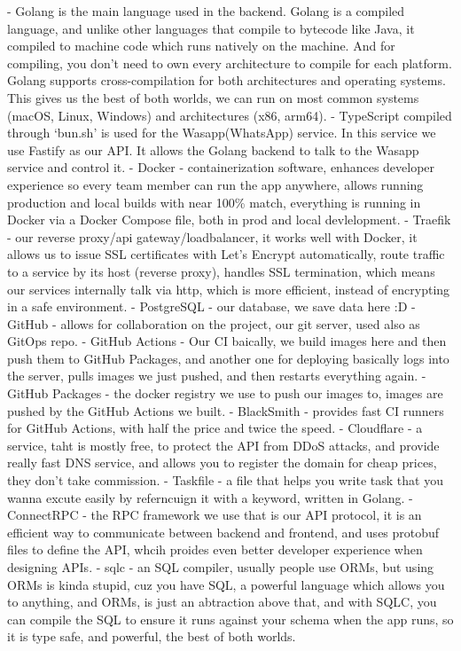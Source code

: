 - Golang is the main language used in the backend. Golang is a compiled language, and unlike other languages that compile to bytecode like Java, it compiled to machine code which runs natively on the machine. And for compiling, you don't need to own every architecture to compile for each platform. Golang supports cross-compilation for both architectures and operating systems. This gives us the best of both worlds, we can run on most common systems (macOS, Linux, Windows) and architectures (x86, arm64).
- TypeScript compiled through `bun.sh' is used for the Wasapp(WhatsApp) service. In this service we use Fastify as our API. It allows the Golang backend to talk to the Wasapp service and control it.
- Docker - containerization software, enhances developer experience so every team member can run the app anywhere, allows running production and local builds with near 100\% match, everything is running in Docker via a Docker Compose file, both in prod and local devlelopment.
- Traefik - our reverse proxy/api gateway/loadbalancer, it works well with Docker, it allows us to issue SSL certificates with Let's Encrypt automatically, route traffic to a service by its host (reverse proxy), handles SSL termination, which means our services internally talk via http, which is more efficient, instead of encrypting in a safe environment.
- PostgreSQL - our database, we save data here :D
- GitHub - allows for collaboration on the project, our git server, used also as GitOps repo.
    - GitHub Actions - Our CI baically, we build images here and then push them to GitHub Packages, and another one for deploying basically logs into the server, pulls images we just pushed, and then restarts everything again.
    - GitHub Packages - the docker registry we use to push our images to, images are pushed by the GitHub Actions we built.
    - BlackSmith - provides fast CI runners for GitHub Actions, with half the price and twice the speed.
- Cloudflare -  a service, taht is mostly free, to protect the API from DDoS attacks, and provide really fast DNS service, and allows you to register the domain for cheap prices, they don't take commission.
- Taskfile - a file that helps you write task that you wanna excute easily by referncuign it with a keyword, written in Golang.
- ConnectRPC - the RPC framework we use that is our API protocol, it is an efficient way to communicate between backend and frontend, and uses protobuf files to define the API, whcih proides even better developer experience when designing APIs.
- sqlc - an SQL compiler, usually people use ORMs, but using ORMs is kinda stupid, cuz you have SQL, a powerful language which allows you to anything, and ORMs, is just an abtraction above that, and with SQLC, you can compile the SQL to ensure it runs against your schema when the app runs, so it is type safe, and powerful, the best of both worlds.
